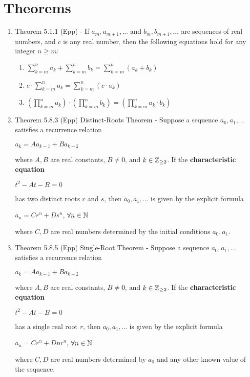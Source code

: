 \documentclass[a4paper]{article}
\begin{document}
\newpage
\appendix
\section{Theorems}
\begin{enumerate}
	\item[] Theorem 5.1.1 (Epp) - If $a_m, a_{m+1}, \dots$ and $b_m, b_{m+1}, \dots$ are sequences of real numbers, and $c$ is any real number, then the following equations hold for any integer $n \ge m$:
	\begin{enumerate}
		\item $\sum\limits_{k=m}^{n}a_k + \sum\limits_{k=m}^{n}b_k = 
		\sum\limits_{k=m}^{n}(a_k + b_k)$
		\item
		$c\cdot \sum\limits_{k=m}^{n}a_k = 
		\sum\limits_{k=m}^{n}(c \cdot a_k)$
		\item
		$(\prod\limits_{k=m}^{n}a_k)\cdot (\prod\limits_{k=m}^{n}b_k) = (\prod\limits_{k=m}^{n}a_k \cdot b_k)$
	\end{enumerate}
	\item[] Theorem 5.8.3 (Epp) Distinct-Roots Theorem - Suppose a sequence $a_0, a_1, \dots$ satisfies a recurrence relation 
	\begin{center}
		$a_k = Aa_{k-1} + Ba_{k-2}$
	\end{center}
	where $A,B$ are real constants, $B\neq 0$, and $k \in \mathbb{Z}_{\ge2}$. If the \textbf{characteristic equation}
	\begin{center}
		$t^2 - At - B = 0$
	\end{center}
	has two distinct roots $r$ and $s$, then $a_0, a_1,\dots$ is given by the explicit formula 
	\begin{center}
		$a_n = Cr^n + Ds^n$, $\forall n \in \mathbb{N}$
	\end{center}
	where $C, D$ are real numbers determined by the initial conditions $a_0, a_1$.
	\item[] Theorem 5.8.5 (Epp) Single-Root Theorem - Suppose a sequence $a_0, a_1, \dots$ satisfies a recurrence relation 
	\begin{center}
		$a_k = Aa_{k-1} + Ba_{k-2}$
	\end{center}
	where $A,B$ are real constants, $B\neq 0$, and $k \in \mathbb{Z}_{\ge2}$. If the \textbf{characteristic equation}
	\begin{center}
		$t^2 - At - B = 0$
	\end{center}
	has a single real root $r$, then $a_0, a_1,\dots$ is given by the explicit formula 
	\begin{center}
		$a_n = Cr^n + Dnr^n$, $\forall n \in \mathbb{N}$
	\end{center}
	where $C, D$ are real numbers determined by $a_0$ and any other known value of the sequence.
\end{enumerate}
\end{document}
